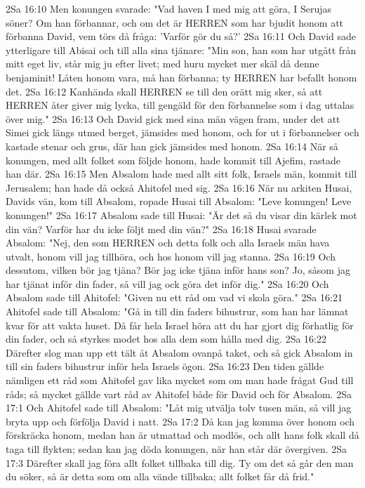 2Sa 16:10  Men konungen svarade: "Vad haven I med mig att göra, I Serujas söner? Om han förbannar, och om det är HERREN som har bjudit honom att förbanna David, vem törs då fråga: 'Varför gör du så?'
2Sa 16:11  Och David sade ytterligare till Abisai och till alla sina tjänare: "Min son, han som har utgått från mitt eget liv, står mig ju efter livet; med huru mycket mer skäl då denne benjaminit! Låten honom vara, må han förbanna; ty HERREN har befallt honom det.
2Sa 16:12  Kanhända skall HERREN se till den orätt mig sker, så att HERREN åter giver mig lycka, till gengäld för den förbannelse som i dag uttalas över mig."
2Sa 16:13  Och David gick med sina män vägen fram, under det att Simei gick längs utmed berget, jämsides med honom, och for ut i förbannelser och kastade stenar och grus, där han gick jämsides med honom.
2Sa 16:14  När så konungen, med allt folket som följde honom, hade kommit till Ajefim, rastade han där.
2Sa 16:15  Men Absalom hade med allt sitt folk, Israels män, kommit till Jerusalem; han hade då också Ahitofel med sig.
2Sa 16:16  När nu arkiten Husai, Davids vän, kom till Absalom, ropade Husai till Absalom: "Leve konungen! Leve konungen!"
2Sa 16:17  Absalom sade till Husai: "Är det så du visar din kärlek mot din vän? Varför har du icke följt med din vän?"
2Sa 16:18  Husai svarade Absalom: "Nej, den som HERREN och detta folk och alla Israels män hava utvalt, honom vill jag tillhöra, och hos honom vill jag stanna.
2Sa 16:19  Och dessutom, vilken bör jag tjäna? Bör jag icke tjäna inför hans son? Jo, såsom jag har tjänat inför din fader, så vill jag ock göra det inför dig."
2Sa 16:20  Och Absalom sade till Ahitofel: "Given nu ett råd om vad vi skola göra."
2Sa 16:21  Ahitofel sade till Absalom: "Gå in till din faders bihustrur, som han har lämnat kvar för att vakta huset. Då får hela Israel höra att du har gjort dig förhatlig för din fader, och så styrkes modet hos alla dem som hålla med dig.
2Sa 16:22  Därefter slog man upp ett tält åt Absalom ovanpå taket, och så gick Absalom in till sin faders bihustrur inför hela Israels ögon.
2Sa 16:23  Den tiden gällde nämligen ett råd som Ahitofel gav lika mycket som om man hade frågat Gud till råds; så mycket gällde vart råd av Ahitofel både för David och för Absalom.
2Sa 17:1  Och Ahitofel sade till Absalom: "Låt mig utvälja tolv tusen män, så vill jag bryta upp och förfölja David i natt.
2Sa 17:2  Då kan jag komma över honom och förskräcka honom, medan han är utmattad och modlös, och allt hans folk skall då taga till flykten; sedan kan jag döda konungen, när han står där övergiven.
2Sa 17:3  Därefter skall jag föra allt folket tillbaka till dig. Ty om det så går den man du söker, så är detta som om alla vände tillbaka; allt folket får då frid."
